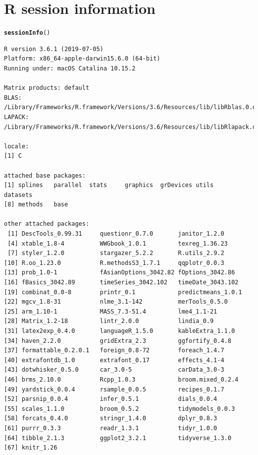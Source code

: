 \documentclass{article}\usepackage[]{graphicx}\usepackage[]{color}
\makeatletter
\newcommand{\hlstd}[1]{\textcolor[rgb]{0.345,0.345,0.345}{#1}}%
\newcommand{\hlkwd}[1]{\textcolor[rgb]{0.737,0.353,0.396}{\textbf{#1}}}%
\newenvironment{kframe}{%
 \def\at@end@of@kframe{}%
 \ifinner\ifhmode%
  \def\at@end@of@kframe{\end{minipage}}%
  \begin{minipage}{\columnwidth}%
 \fi\fi%
 \def\FrameCommand##1{\hskip\@totalleftmargin \hskip-\fboxsep
 \colorbox{shadecolor}{##1}\hskip-\fboxsep
     \hskip-\linewidth \hskip-\@totalleftmargin \hskip\columnwidth}%
 \MakeFramed {\advance\hsize-\width
   \@totalleftmargin\z@ \linewidth\hsize
   \@setminipage}}%
 {\par\unskip\endMakeFramed%
 \at@end@of@kframe}
\newenvironment{knitrout}{}{} %
\makeatother
\begin{document}
\section*{R session information}

\begin{knitrout}\footnotesize
{}\color{fgcolor}\begin{kframe}
\begin{alltt}
\hlkwd{sessionInfo}\hlstd{()}
\end{alltt}
\begin{verbatim}
R version 3.6.1 (2019-07-05)
Platform: x86_64-apple-darwin15.6.0 (64-bit)
Running under: macOS Catalina 10.15.2

Matrix products: default
BLAS:   /Library/Frameworks/R.framework/Versions/3.6/Resources/lib/libRblas.0.dylib
LAPACK: /Library/Frameworks/R.framework/Versions/3.6/Resources/lib/libRlapack.dylib

locale:
[1] C

attached base packages:
[1] splines   parallel  stats     graphics  grDevices utils     datasets 
[8] methods   base     

other attached packages:
 [1] DescTools_0.99.31     questionr_0.7.0       janitor_1.2.0        
 [4] xtable_1.8-4          WWGbook_1.0.1         texreg_1.36.23       
 [7] styler_1.2.0          stargazer_5.2.2       R.utils_2.9.2        
[10] R.oo_1.23.0           R.methodsS3_1.7.1     qqplotr_0.0.3        
[13] prob_1.0-1            fAsianOptions_3042.82 fOptions_3042.86     
[16] fBasics_3042.89       timeSeries_3042.102   timeDate_3043.102    
[19] combinat_0.0-8        printr_0.1            predictmeans_1.0.1   
[22] mgcv_1.8-31           nlme_3.1-142          merTools_0.5.0       
[25] arm_1.10-1            MASS_7.3-51.4         lme4_1.1-21          
[28] Matrix_1.2-18         lintr_2.0.0           lindia_0.9           
[31] latex2exp_0.4.0       languageR_1.5.0       kableExtra_1.1.0     
[34] haven_2.2.0           gridExtra_2.3         ggfortify_0.4.8      
[37] formattable_0.2.0.1   foreign_0.8-72        foreach_1.4.7        
[40] extrafontdb_1.0       extrafont_0.17        effects_4.1-4        
[43] dotwhisker_0.5.0      car_3.0-5             carData_3.0-3        
[46] brms_2.10.0           Rcpp_1.0.3            broom.mixed_0.2.4    
[49] yardstick_0.0.4       rsample_0.0.5         recipes_0.1.7        
[52] parsnip_0.0.4         infer_0.5.1           dials_0.0.4          
[55] scales_1.1.0          broom_0.5.2           tidymodels_0.0.3     
[58] forcats_0.4.0         stringr_1.4.0         dplyr_0.8.3          
[61] purrr_0.3.3           readr_1.3.1           tidyr_1.0.0          
[64] tibble_2.1.3          ggplot2_3.2.1         tidyverse_1.3.0      
[67] knitr_1.26           


\end{verbatim}
\end{kframe}
\end{knitrout}
\end{document}
